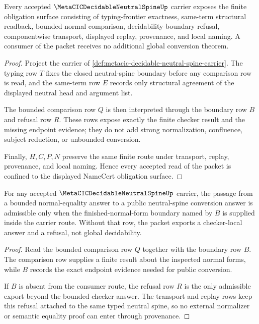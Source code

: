 \begin{theorem}
\label{thm:metacic-decidable-neutral-spine-namecert-obligations}
Every accepted $\MetaCICDecidableNeutralSpineUp$ carrier exposes the finite obligation surface consisting of typing-frontier exactness, same-term structural readback, bounded normal comparison, decidability-boundary refusal, componentwise transport, displayed replay, provenance, and local naming. A consumer of the packet receives no additional global conversion theorem.
\end{theorem}
\begin{proof}
Project the carrier of \autoref{def:metacic-decidable-neutral-spine-carrier}. The typing row $T$ fixes the closed neutral-spine boundary before any comparison row is read, and the same-term row $E$ records only structural agreement of the displayed neutral head and argument list.

The bounded comparison row $Q$ is then interpreted through the boundary row $B$ and refusal row $R$. These rows expose exactly the finite checker result and the missing endpoint evidence; they do not add strong normalization, confluence, subject reduction, or unbounded conversion.

Finally, $H,C,P,N$ preserve the same finite route under transport, replay, provenance, and local naming. Hence every accepted read of the packet is confined to the displayed NameCert obligation surface.
\end{proof}

\begin{theorem}
\label{thm:metacic-decidable-neutral-spine-boundary}
For any accepted $\MetaCICDecidableNeutralSpineUp$ carrier, the passage from a bounded normal-equality answer to a public neutral-spine conversion answer is admissible only when the finished-normal-form boundary named by $B$ is supplied inside the carrier route. Without that row, the packet exports a checker-local answer and a refusal, not global decidability.
\end{theorem}
\begin{proof}
Read the bounded comparison row $Q$ together with the boundary row $B$. The comparison row supplies a finite result about the inspected normal forms, while $B$ records the exact endpoint evidence needed for public conversion.

If $B$ is absent from the consumer route, the refusal row $R$ is the only admissible export beyond the bounded checker answer. The transport and replay rows keep this refusal attached to the same typed neutral spine, so no external normalizer or semantic equality proof can enter through provenance.
\end{proof}

